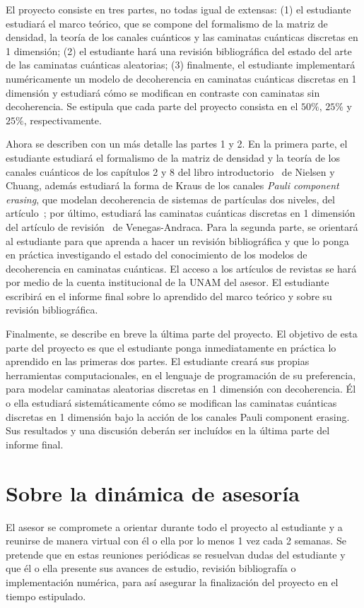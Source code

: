 \documentclass[11pt,letterpaper]{article}
\begin{document}
El proyecto consiste en tres partes, no todas igual de extensas: 
(1) el estudiante
estudiará el marco teórico, 
que se compone del formalismo de la matriz de densidad,
la teoría de los canales cuánticos y las caminatas cuánticas discretas en 1 
dimensión; (2) el estudiante hará una revisión bibliográfica del estado del
arte de las caminatas cuánticas aleatorias; (3) finalmente, el estudiante
implementará numéricamente un modelo de decoherencia en caminatas cuánticas
discretas en 1 dimensión y estudiará cómo se modifican en contraste con 
caminatas sin decoherencia. Se estipula que cada parte del proyecto consista
en el $50\%,\,25\%$ y $25\%$, respectivamente.

Ahora se describen con un más detalle las partes 1 y 2. En la primera parte,
el estudiante estudiará el formalismo de la matriz de densidad y la teoría 
de los canales cuánticos de los capítulos 2 y 8 del libro introductorio~\cite{nielsen_chuang_2010} de Nielsen y Chuang, además 
estudiará la forma de Kraus de los canales \textit{Pauli component erasing}, que 
modelan decoherencia de sistemas de partículas dos niveles, del artículo~\cite{PCE2022}; por último, estudiará 
las caminatas cuánticas discretas en 1 dimensión del artículo de
revisión~\cite{venegas2012quantum} de Venegas-Andraca. Para la segunda parte, 
se orientará al estudiante para que aprenda a hacer un revisión bibliográfica
y que lo ponga en práctica investigando el estado del conocimiento 
de los modelos de decoherencia
en caminatas cuánticas. El acceso a los artículos de revistas se hará por 
medio de la cuenta institucional de la UNAM del asesor. El estudiante 
escribirá en el informe final sobre lo aprendido del marco teórico y 
sobre su revisión bibliográfica.

Finalmente, se describe en breve la última parte del proyecto. El objetivo 
de esta parte del proyecto es que el estudiante ponga inmediatamente en
práctica lo aprendido en las primeras dos partes. El estudiante 
creará sus propias herramientas computacionales, en el lenguaje de programación
de su preferencia, para modelar caminatas aleatorias discretas en 1 dimensión 
con decoherencia. Él o ella estudiará sistemáticamente cómo se modifican 
las caminatas cuánticas discretas en 1 dimensión bajo la acción de los 
canales Pauli component erasing. Sus resultados y una discusión deberán 
ser incluídos en la última parte del informe final.

\section{Sobre la dinámica de asesoría}
El asesor se compromete a orientar durante todo el proyecto al estudiante
y a reunirse de manera virtual con él o ella por lo menos 1 vez cada 2
semanas. Se pretende que en estas reuniones periódicas se resuelvan 
dudas del estudiante y que él o ella presente sus avances de estudio, revisión bibliografía o implementación numérica,
para así asegurar la finalización del proyecto en el tiempo estipulado.




\end{document}
